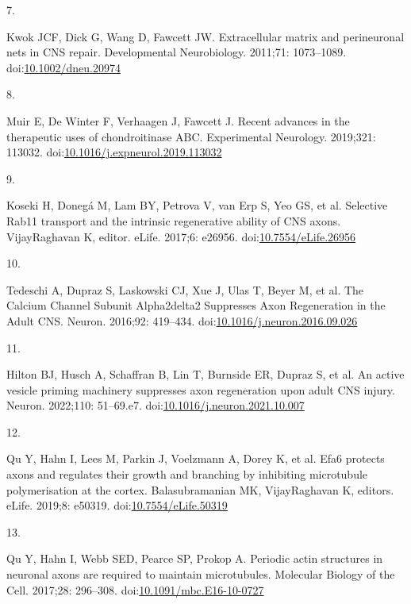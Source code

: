\documentclass[
  12pt,
  a4paper,
]{book}
\newlength{\cslhangindent}
\newlength{\csllabelwidth}
\newlength{\cslentryspacingunit} %
\newenvironment{CSLReferences}[2] %
 {%
  \setlength{\parindent}{0pt}
  \ifodd #1
  \let\oldpar\par
  \def\par{\hangindent=\cslhangindent\oldpar}
  \fi
  \setlength{\parskip}{#2\cslentryspacingunit}
 }%
 {}
\newcommand{\CSLLeftMargin}[1]{\parbox[t]{\csllabelwidth}{#1}}
\newcommand{\CSLRightInline}[1]{\parbox[t]{\linewidth - \csllabelwidth}{#1}\break}
\begin{document}
\begin{CSLReferences}{0}{0}
\leavevmode{}%
\CSLLeftMargin{7. }%
\CSLRightInline{Kwok JCF, Dick G, Wang D, Fawcett JW. Extracellular matrix and perineuronal nets in {CNS} repair. Developmental Neurobiology. 2011;71: 1073--1089. doi:\href{https://doi.org/10.1002/dneu.20974}{10.1002/dneu.20974}}

\leavevmode{}%
\CSLLeftMargin{8. }%
\CSLRightInline{Muir E, De Winter F, Verhaagen J, Fawcett J. Recent advances in the therapeutic uses of chondroitinase {ABC}. Experimental Neurology. 2019;321: 113032. doi:\href{https://doi.org/10.1016/j.expneurol.2019.113032}{10.1016/j.expneurol.2019.113032}}

\leavevmode{}%
\CSLLeftMargin{9. }%
\CSLRightInline{Koseki H, Donegá M, Lam BY, Petrova V, van Erp S, Yeo GS, et al. Selective Rab11 transport and the intrinsic regenerative ability of {CNS} axons. VijayRaghavan K, editor. eLife. 2017;6: e26956. doi:\href{https://doi.org/10.7554/eLife.26956}{10.7554/eLife.26956}}

\leavevmode{}%
\CSLLeftMargin{10. }%
\CSLRightInline{Tedeschi A, Dupraz S, Laskowski CJ, Xue J, Ulas T, Beyer M, et al. The {Calcium Channel Subunit Alpha2delta2 Suppresses Axon Regeneration} in the {Adult CNS}. Neuron. 2016;92: 419--434. doi:\href{https://doi.org/10.1016/j.neuron.2016.09.026}{10.1016/j.neuron.2016.09.026}}

\leavevmode{}%
\CSLLeftMargin{11. }%
\CSLRightInline{Hilton BJ, Husch A, Schaffran B, Lin T, Burnside ER, Dupraz S, et al. An active vesicle priming machinery suppresses axon regeneration upon adult {CNS} injury. Neuron. 2022;110: 51--69.e7. doi:\href{https://doi.org/10.1016/j.neuron.2021.10.007}{10.1016/j.neuron.2021.10.007}}

\leavevmode{}%
\CSLLeftMargin{12. }%
\CSLRightInline{Qu Y, Hahn I, Lees M, Parkin J, Voelzmann A, Dorey K, et al. Efa6 protects axons and regulates their growth and branching by inhibiting microtubule polymerisation at the cortex. Balasubramanian MK, VijayRaghavan K, editors. eLife. 2019;8: e50319. doi:\href{https://doi.org/10.7554/eLife.50319}{10.7554/eLife.50319}}

\leavevmode{}%
\CSLLeftMargin{13. }%
\CSLRightInline{Qu Y, Hahn I, Webb SED, Pearce SP, Prokop A. Periodic actin structures in neuronal axons are required to maintain microtubules. Molecular Biology of the Cell. 2017;28: 296--308. doi:\href{https://doi.org/10.1091/mbc.E16-10-0727}{10.1091/mbc.E16-10-0727}}


\end{CSLReferences}
\end{document}
